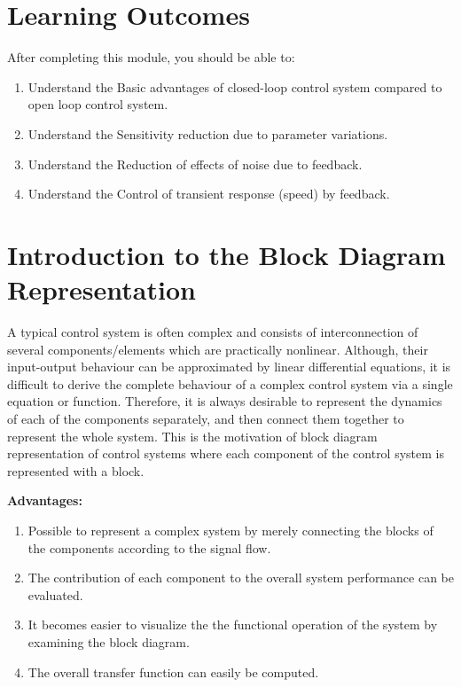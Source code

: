 \documentclass[
  14pt,
  a4paper,
  oneside,
  open=any,
  a4paper,
  14pt]{report}
\begin{document}
\section*{Learning Outcomes}\label{learning-outcomes-2}


After completing this module, you should be able to:

\begin{enumerate}
\def\labelenumi{\arabic{enumi}.}
\item
  Understand the Basic advantages of closed-loop control system compared
  to open loop control system.
\item
  Understand the Sensitivity reduction due to parameter variations.
\item
  Understand the Reduction of effects of noise due to feedback.
\item
  Understand the Control of transient response (speed) by feedback.
\end{enumerate}

\section{Introduction to the Block Diagram
Representation}\label{introduction-to-the-block-diagram-representation}

A typical control system is often complex and consists of
interconnection of several components/elements which are practically
nonlinear. Although, their input-output behaviour can be approximated by
linear differential equations, it is difficult to derive the complete
behaviour of a complex control system via a single equation or function.
Therefore, it is always desirable to represent the dynamics of each of
the components separately, and then connect them together to represent
the whole system. This is the motivation of block diagram representation
of control systems where each component of the control system is
represented with a block.

\textbf{Advantages:}

\begin{enumerate}
\def\labelenumi{\arabic{enumi}.}
\item
  Possible to represent a complex system by merely connecting the blocks
  of the components according to the signal flow.
\item
  The contribution of each component to the overall system performance
  can be evaluated.
\item
  It becomes easier to visualize the the functional operation of the
  system by examining the block diagram.
\item
  The overall transfer function can easily be computed.
\end{enumerate}
\end{document}

